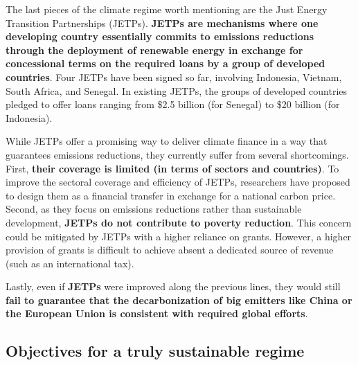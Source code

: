 \documentclass[12pt,english]{article}
\begin{document}
The last pieces of the climate regime worth mentioning are the Just Energy Transition Partnerships (JETPs).\textbf{ JETPs are mechanisms where one developing country essentially commits to emissions reductions through the deployment of renewable energy in exchange for concessional terms on the required loans by a group of developed countries}. Four JETPs have been signed so far, involving Indonesia, Vietnam, South Africa, and Senegal.\cite{ha-duong_just_2023} In existing JETPs, the groups of developed countries pledged to offer loans ranging from \$2.5 billion (for Senegal) to \$20 billion (for Indonesia). 

While JETPs offer a promising way to deliver climate finance in a way that guarantees emissions reductions, they currently suffer from several shortcomings. First, \textbf{their coverage is limited (in terms of sectors and countries)}. To improve the sectoral coverage and efficiency of JETPs, researchers have proposed to design them as a financial transfer in exchange for a national carbon price.\cite{steckel_climate_2017} Second, as they focus on emissions reductions rather than sustainable development, \textbf{JETPs do not contribute to poverty reduction}. This concern could be mitigated by JETPs with a higher reliance on grants.\cite{bolton_why_2025} However, a higher provision of grants is difficult to achieve absent a dedicated source of revenue (such as an international tax).

Lastly, even if \textbf{JETPs} were improved along the previous lines, they would still \textbf{fail to guarantee that the decarbonization of big emitters like China or the European Union is consistent with required global efforts}. 


\subsection{Objectives for a truly sustainable regime\label{subsec:objectives}}
\end{document}
